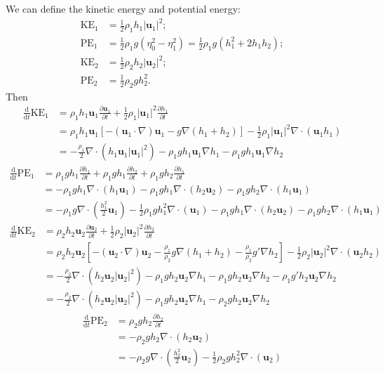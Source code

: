 \documentclass[11pt,letterpaper]{book}
\theoremstyle{definition}
\newcommand{\de}{\mathrm{d}}
\newcommand{\pe}{\partial}
\newcommand{\ve}[1]{\boldsymbol{#1}}
\begin{document}
We can define the kinetic energy and potential energy:
\begin{align*}
\text{KE}_1 &= \frac{1}{2}\rho_1h_1|\ve u_1|^2;\\
\text{PE}_1 &= \frac{1}{2}\rho_1g(\eta_0^2-\eta_1^2) = \frac{1}{2}\rho_1g(h_1^2+2h_1h_2);\\
\text{KE}_2 &= \frac{1}{2}\rho_2h_2|\ve u_2|^2;\\
\text{PE}_2 &= \frac{1}{2}\rho_2gh_2^2.
\end{align*}
Then
\begin{align*}
\frac{\de}{\de t}\text{KE}_1 &= \rho_1h_1\ve u_1\frac{\pe \ve u_1}{\pe t}+\frac{1}{2}\rho_1|\ve u_1|^2\frac{\pe h_1}{\pe t}\\
&= \rho_1h_1\ve u_1\left[-(\ve u_1\cdot\nabla)\ve u_1-g\nabla (h_1+h_2)\right] -\frac{1}{2}\rho_1|\ve u_1|^2\nabla\cdot(\ve u_1h_1)\\
&= -\frac{\rho_1}{2}\nabla\cdot(h_1\ve u_1|\ve u_1|^2)-\rho_1gh_1\ve u_1\nabla h_1-\rho_1gh_1\ve u_1\nabla h_2
\end{align*}
\begin{align*}
\frac{\de}{\de t}\text{PE}_1 &= \rho_1 g h_1\frac{\pe h_1}{\pe t}+\rho_1 gh_1\frac{\pe h_2}{\pe t}+\rho_1 gh_2\frac{\pe h_1}{\pe t}\\
&= -\rho_1 g h_1\nabla\cdot(h_1\ve u_1)-\rho_1 gh_1\nabla\cdot(h_2\ve u_2)-\rho_1 gh_2\nabla\cdot(h_1\ve u_1)\\
&= -\rho_1 g\nabla\cdot\left(\frac{h_1^2}{2}\ve u_1\right)-\frac{1}{2}\rho_1 g h_1^2\nabla\cdot(\ve u_1)-\rho_1 gh_1\nabla\cdot(h_2\ve u_2)-\rho_1 gh_2\nabla\cdot(h_1\ve u_1)
\end{align*}
\begin{align*}
\frac{\de}{\de t}\text{KE}_2 &= \rho_2h_2\ve u_2\frac{\pe \ve u_2}{\pe t}+\frac{1}{2}\rho_2|\ve u_2|^2\frac{\pe h_2}{\pe t}\\
&= \rho_2h_2\ve u_2\left[-(\ve u_2\cdot\nabla)\ve u_2-\frac{\rho_1}{\rho_2} g\nabla (h_1+h_2)-\frac{\rho_1}{\rho_2} g'\nabla h_2\right] -\frac{1}{2}\rho_2|\ve u_2|^2\nabla\cdot(\ve u_2h_2)\\
&= -\frac{\rho_2}{2}\nabla\cdot(h_2\ve u_2|\ve u_2|^2)-\rho_1gh_2\ve u_2\nabla h_1-\rho_1gh_2\ve u_2\nabla h_2-\rho_1 g'h_2\ve u_2\nabla h_2\\
&= -\frac{\rho_2}{2}\nabla\cdot(h_2\ve u_2|\ve u_2|^2)-\rho_1gh_2\ve u_2\nabla h_1-\rho_2gh_2\ve u_2\nabla h_2
\end{align*}
\begin{align*}
\frac{\de}{\de t}\text{PE}_2 &= \rho_2 g h_2\frac{\pe h_2}{\pe t}\\
&= -\rho_2 g h_2\nabla\cdot(h_2\ve u_2)\\
&= -\rho_2 g\nabla\cdot\left(\frac{h_2^2}{2}\ve u_2\right)-\frac{1}{2}\rho_2 g h_2^2\nabla\cdot(\ve u_2)
\end{align*}
\end{document}
